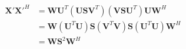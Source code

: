 \documentclass[10pt]{article}
\begin{document}
\begin{align*}\begin{split}
\boldsymbol X' \boldsymbol X'^H &= 
\boldsymbol W \boldsymbol U^T \left( \boldsymbol U \boldsymbol S \boldsymbol V^T\right)
\left( \boldsymbol V \boldsymbol S \boldsymbol U^T \right) \boldsymbol U \boldsymbol W^H \\
&= \boldsymbol W \left( \boldsymbol U^T \boldsymbol U \right)
\boldsymbol S \left(\boldsymbol V^T \boldsymbol V\right) \boldsymbol S
\left( \boldsymbol U^T \boldsymbol U \right) \boldsymbol W^H \\
&= \boldsymbol W \boldsymbol S^2 \boldsymbol W^H \\
\end{split}\end{align*}
\end{document}
